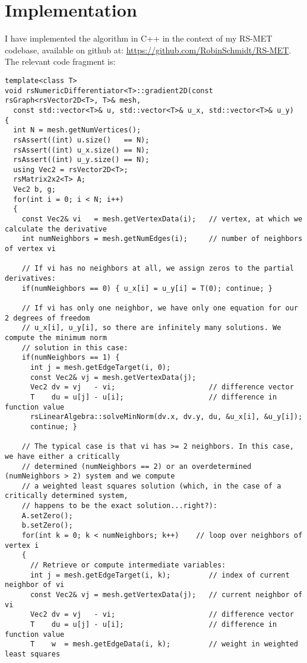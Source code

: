 \section{Implementation}
I have implemented the algorithm in C++ in the context of my RS-MET codebase, available on github at: \hyperlink{https://github.com/RobinSchmidt/RS-MET}{https://github.com/RobinSchmidt/RS-MET}. The relevant code fragment is:
\begin{lstlisting}
template<class T>
void rsNumericDifferentiator<T>::gradient2D(const rsGraph<rsVector2D<T>, T>& mesh, 
  const std::vector<T>& u, std::vector<T>& u_x, std::vector<T>& u_y)
{
  int N = mesh.getNumVertices();
  rsAssert((int) u.size()   == N);
  rsAssert((int) u_x.size() == N);
  rsAssert((int) u_y.size() == N);
  using Vec2 = rsVector2D<T>;
  rsMatrix2x2<T> A;
  Vec2 b, g;
  for(int i = 0; i < N; i++)
  {
    const Vec2& vi   = mesh.getVertexData(i);   // vertex, at which we calculate the derivative
    int numNeighbors = mesh.getNumEdges(i);     // number of neighbors of vertex vi

    // If vi has no neighbors at all, we assign zeros to the partial derivatives:
    if(numNeighbors == 0) { u_x[i] = u_y[i] = T(0); continue; }

    // If vi has only one neighbor, we have only one equation for our 2 degrees of freedom 
    // u_x[i], u_y[i], so there are infinitely many solutions. We compute the minimum norm 
    // solution in this case:
    if(numNeighbors == 1) {
      int j = mesh.getEdgeTarget(i, 0);
      const Vec2& vj = mesh.getVertexData(j);
      Vec2 dv = vj   - vi;                      // difference vector
      T    du = u[j] - u[i];                    // difference in function value
      rsLinearAlgebra::solveMinNorm(dv.x, dv.y, du, &u_x[i], &u_y[i]);
      continue; }

    // The typical case is that vi has >= 2 neighbors. In this case, we have either a critically
    // determined (numNeighbors == 2) or an overdetermined (numNeighbors > 2) system and we compute
    // a weighted least squares solution (which, in the case of a critically determined system, 
    // happens to be the exact solution...right?):
    A.setZero();
    b.setZero();
    for(int k = 0; k < numNeighbors; k++)    // loop over neighbors of vertex i
    {
      // Retrieve or compute intermediate variables:
      int j = mesh.getEdgeTarget(i, k);         // index of current neighbor of vi
      const Vec2& vj = mesh.getVertexData(j);   // current neighbor of vi
      Vec2 dv = vj   - vi;                      // difference vector
      T    du = u[j] - u[i];                    // difference in function value
      T    w  = mesh.getEdgeData(i, k);         // weight in weighted least squares


\end{lstlisting}

